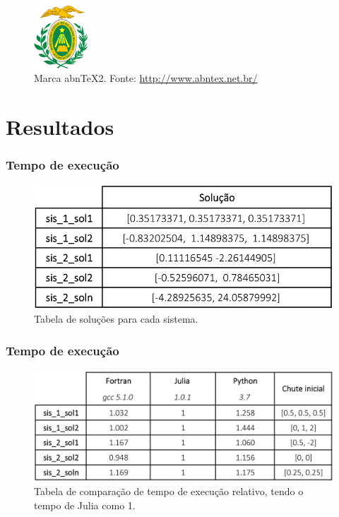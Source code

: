 \documentclass[aspectratio=1610]{beamer}
\begin{document}
\begin{frame}

\begin{figure}
  \centering
  \includegraphics[width=2cm]{ufrn.jpg}
  \caption{Marca abnTeX2. Fonte: \url{http://www.abntex.net.br/}}
\end{figure}

\end{frame}

\section{Resultados}


\begin{frame}
\frametitle{Tempo de execução}


\begin{figure}
  \centering
  \includegraphics[scale=0.55]{Imagens/sol.jpg}
  \caption{Tabela de soluções para cada sistema.}
\end{figure}


\end{frame}



\begin{frame}
\frametitle{Tempo de execução}


\begin{figure}
  \centering
  \includegraphics[scale=0.55]{Imagens/exe_rel.jpg}
  \caption{Tabela de comparação de tempo de execução relativo, tendo o tempo de Julia como 1.}
\end{figure}


\end{frame}
\end{document}
